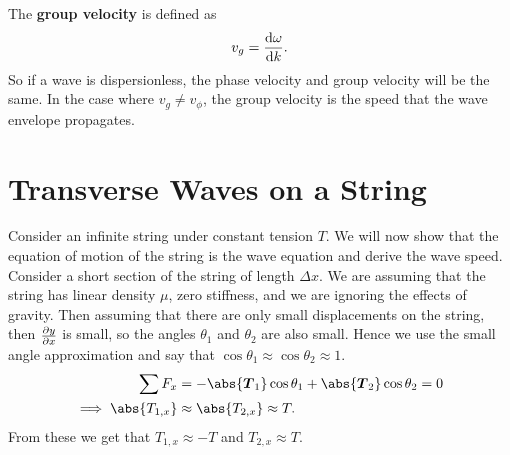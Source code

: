 \documentclass[../classical_mechanics.tex]{subfiles}
\begin{document}
        The \textbf{group velocity} is defined as
        \begin{equation}
            v_g=\dv{\omega}{k}.
        \end{equation}
        So if a wave is dispersionless, the phase velocity and group velocity will be the same.
        In the case where $v_g\neq v_\phi$, the group velocity is the speed that the wave envelope propagates.

    \section{Transverse Waves on a String}\label{sec:transverse-waves-on-a-string}
        Consider an infinite string under constant tension $T$.
        We will now show that the equation of motion of the string is the wave equation and derive the wave speed.
        Consider a short section of the string of length $\Delta x$.
        We are assuming that the string has linear density $\mu$, zero stiffness, and we are ignoring the effects of gravity.
        Then assuming that there are only small displacements on the string, then $\pdv{y}{x}$ is small, so the angles $\theta_1$ and $\theta_2$ are also small.
        Hence we use the small angle approximation and say that $\cos\theta_1\approx\cos\theta_2\approx 1$.
        \begin{align}
            \sum F_x&=-\abs{\vec{T}_1}\cos\theta_1+\abs{\vec{T}_2}\cos\theta_2=0\\
            \implies\abs{T_{1,x}}&\approx\abs{T_{2,x}}\approx T.
        \end{align}
        From these we get that $T_{1,x}\approx -T$ and $T_{2,x}\approx T$.
        
\end{document}
